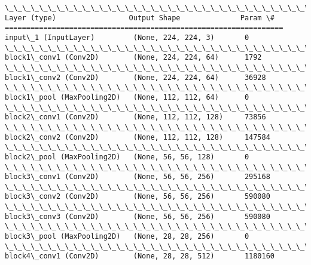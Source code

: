 \documentclass[11pt]{article}
\begin{document}
    \begin{Verbatim}[commandchars=\\\{\}]
\_\_\_\_\_\_\_\_\_\_\_\_\_\_\_\_\_\_\_\_\_\_\_\_\_\_\_\_\_\_\_\_\_\_\_\_\_\_\_\_\_\_\_\_\_\_\_\_\_\_\_\_\_\_\_\_\_\_\_\_\_\_\_\_\_
Layer (type)                 Output Shape              Param \#   
=================================================================
input\_1 (InputLayer)         (None, 224, 224, 3)       0         
\_\_\_\_\_\_\_\_\_\_\_\_\_\_\_\_\_\_\_\_\_\_\_\_\_\_\_\_\_\_\_\_\_\_\_\_\_\_\_\_\_\_\_\_\_\_\_\_\_\_\_\_\_\_\_\_\_\_\_\_\_\_\_\_\_
block1\_conv1 (Conv2D)        (None, 224, 224, 64)      1792      
\_\_\_\_\_\_\_\_\_\_\_\_\_\_\_\_\_\_\_\_\_\_\_\_\_\_\_\_\_\_\_\_\_\_\_\_\_\_\_\_\_\_\_\_\_\_\_\_\_\_\_\_\_\_\_\_\_\_\_\_\_\_\_\_\_
block1\_conv2 (Conv2D)        (None, 224, 224, 64)      36928     
\_\_\_\_\_\_\_\_\_\_\_\_\_\_\_\_\_\_\_\_\_\_\_\_\_\_\_\_\_\_\_\_\_\_\_\_\_\_\_\_\_\_\_\_\_\_\_\_\_\_\_\_\_\_\_\_\_\_\_\_\_\_\_\_\_
block1\_pool (MaxPooling2D)   (None, 112, 112, 64)      0         
\_\_\_\_\_\_\_\_\_\_\_\_\_\_\_\_\_\_\_\_\_\_\_\_\_\_\_\_\_\_\_\_\_\_\_\_\_\_\_\_\_\_\_\_\_\_\_\_\_\_\_\_\_\_\_\_\_\_\_\_\_\_\_\_\_
block2\_conv1 (Conv2D)        (None, 112, 112, 128)     73856     
\_\_\_\_\_\_\_\_\_\_\_\_\_\_\_\_\_\_\_\_\_\_\_\_\_\_\_\_\_\_\_\_\_\_\_\_\_\_\_\_\_\_\_\_\_\_\_\_\_\_\_\_\_\_\_\_\_\_\_\_\_\_\_\_\_
block2\_conv2 (Conv2D)        (None, 112, 112, 128)     147584    
\_\_\_\_\_\_\_\_\_\_\_\_\_\_\_\_\_\_\_\_\_\_\_\_\_\_\_\_\_\_\_\_\_\_\_\_\_\_\_\_\_\_\_\_\_\_\_\_\_\_\_\_\_\_\_\_\_\_\_\_\_\_\_\_\_
block2\_pool (MaxPooling2D)   (None, 56, 56, 128)       0         
\_\_\_\_\_\_\_\_\_\_\_\_\_\_\_\_\_\_\_\_\_\_\_\_\_\_\_\_\_\_\_\_\_\_\_\_\_\_\_\_\_\_\_\_\_\_\_\_\_\_\_\_\_\_\_\_\_\_\_\_\_\_\_\_\_
block3\_conv1 (Conv2D)        (None, 56, 56, 256)       295168    
\_\_\_\_\_\_\_\_\_\_\_\_\_\_\_\_\_\_\_\_\_\_\_\_\_\_\_\_\_\_\_\_\_\_\_\_\_\_\_\_\_\_\_\_\_\_\_\_\_\_\_\_\_\_\_\_\_\_\_\_\_\_\_\_\_
block3\_conv2 (Conv2D)        (None, 56, 56, 256)       590080    
\_\_\_\_\_\_\_\_\_\_\_\_\_\_\_\_\_\_\_\_\_\_\_\_\_\_\_\_\_\_\_\_\_\_\_\_\_\_\_\_\_\_\_\_\_\_\_\_\_\_\_\_\_\_\_\_\_\_\_\_\_\_\_\_\_
block3\_conv3 (Conv2D)        (None, 56, 56, 256)       590080    
\_\_\_\_\_\_\_\_\_\_\_\_\_\_\_\_\_\_\_\_\_\_\_\_\_\_\_\_\_\_\_\_\_\_\_\_\_\_\_\_\_\_\_\_\_\_\_\_\_\_\_\_\_\_\_\_\_\_\_\_\_\_\_\_\_
block3\_pool (MaxPooling2D)   (None, 28, 28, 256)       0         
\_\_\_\_\_\_\_\_\_\_\_\_\_\_\_\_\_\_\_\_\_\_\_\_\_\_\_\_\_\_\_\_\_\_\_\_\_\_\_\_\_\_\_\_\_\_\_\_\_\_\_\_\_\_\_\_\_\_\_\_\_\_\_\_\_
block4\_conv1 (Conv2D)        (None, 28, 28, 512)       1180160   

\end{Verbatim}
\end{document}
